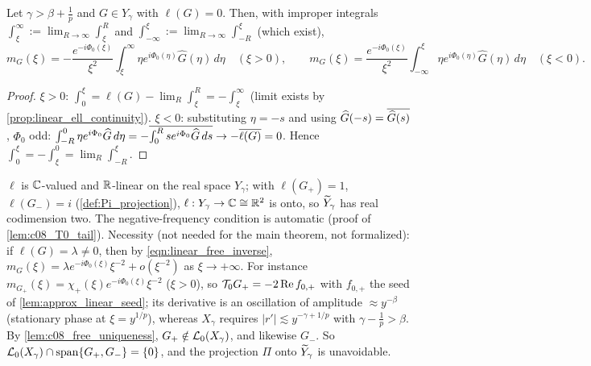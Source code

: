 \begin{lemma}
  \label{lem:c08_T0_tail}
  Let $\gamma>\beta+\frac1p$ and $G\in Y_\gamma$ with $\ell(G)=0$. Then, with improper integrals
  $\int_\xi^\infty:=\lim_{R\to\infty}\int_\xi^R$ and $\int_{-\infty}^\xi:=\lim_{R\to\infty}\int_{-R}^\xi$ (which exist),
  \begin{equation}\label{eqn:linear_projected_tail}
    m_G(\xi)=-\frac{e^{-i\Phi_0(\xi)}}{\xi^2}\int_\xi^\infty\eta e^{i\Phi_0(\eta)}\widehat G(\eta)\,d\eta\quad(\xi>0),\qquad
    m_G(\xi)=\frac{e^{-i\Phi_0(\xi)}}{\xi^2}\int_{-\infty}^\xi\eta e^{i\Phi_0(\eta)}\widehat G(\eta)\,d\eta\quad(\xi<0).
  \end{equation}
\end{lemma}
\begin{proof}
  $\xi>0$: $\int_0^\xi=\ell(G)-\lim_R\int_\xi^R=-\int_\xi^\infty$ (limit exists by \cref{prop:linear_ell_continuity}). $\xi<0$: substituting
  $\eta=-s$ and using $\widehat G(-s)=\overline{\widehat G(s)}$, $\Phi_0$ odd: $\int_{-R}^0\eta e^{i\Phi_0}\widehat G\,d\eta=-\overline{\int_0^R s e^{i\Phi_0}\widehat G\,ds}\to-\overline{\ell(G)}=0$.
  Hence $\int_0^\xi=-\int_\xi^0=\lim_R\int_{-R}^\xi$.
\end{proof}

\begin{remark}
  \label{rmk:c08_codimension_two}
  $\ell$ is $\mathbb{C}$-valued and $\mathbb{R}$-linear on the real space $Y_\gamma$; with $\ell(G_+)=1$, $\ell(G_-)=i$ (\cref{def:Pi_projection}),
  $\ell:Y_\gamma\to\mathbb{C}\cong\mathbb{R}^2$ is onto, so $\widetilde{Y}_\gamma$ has real codimension two. The negative-frequency condition is automatic
  (proof of \cref{lem:c08_T0_tail}). Necessity (not needed for the main theorem, not formalized): if $\ell(G)=\lambda\neq0$,
  then by \eqref{eqn:linear_free_inverse}, $m_G(\xi)=\lambda e^{-i\Phi_0(\xi)}\xi^{-2}+o(\xi^{-2})$ as $\xi\to+\infty$. For instance
  $m_{G_+}(\xi)=\chi_+(\xi)e^{-i\Phi_0(\xi)}\xi^{-2}$ ($\xi>0$), so $\mathcal{T}_0G_+=-2\operatorname{Re}f_{0,+}$ with $f_{0,+}$ the seed of
  \cref{lem:approx_linear_seed}; its derivative is an oscillation of amplitude $\approx y^{-\beta}$ (stationary phase at
  $\xi=y^{1/p}$), whereas $X_\gamma$ requires $|r'|\lesssim y^{-\gamma+1/p}$ with $\gamma-\frac1p>\beta$. By
  \cref{lem:c08_free_uniqueness}, $G_+\notin\mathcal{L}_0(X_\gamma)$, and likewise $G_-$. So $\mathcal{L}_0(X_\gamma)\cap\operatorname{span}\{G_+,G_-\}=\{0\}$,
  and the projection $\Pi$ onto $\widetilde{Y}_\gamma$ is unavoidable.
\end{remark}

